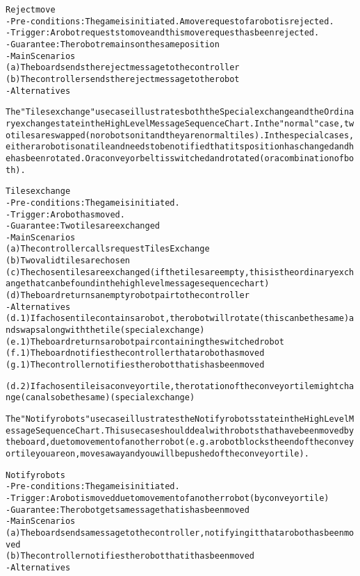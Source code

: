 \begin{alltt}
Reject move
- Pre-conditions: The game is initiated. A move request of a robot is rejected.
- Trigger: A robot requests to move and this move request has been rejected.
- Guarantee: The robot remains on the same position
- Main Scenarios
    (a) The board sends the reject message to the controller
    (b) The controller sends the reject message to the robot
- Alternatives

The "Tiles exchange" use case illustrates both the Special exchange and the Ordinary exchange state in the High Level Message Sequence Chart. In the "normal" case, two tiles are swapped (no robots on it and they are normal tiles). In the special cases, either a robot is on a tile and needs to be notified that its position has changed and he has been rotated. Or a conveyor belt is switched and rotated (or a combination of both).

Tiles exchange
- Pre-conditions: The game is initiated.
- Trigger:  A robot has moved.
- Guarantee: Two tiles are exchanged
- Main Scenarios
    (a) The controller calls requestTilesExchange
    (b) Two valid tiles are chosen
    (c) The chosen tiles are exchanged (if the tiles are empty, this is the ordinary exchange that can be found in the high level message sequence chart)
    (d) The board returns an empty robot pair to the controller
- Alternatives
    (d.1) If a chosen tile contains a robot, the robot will rotate (this can be the same) and swaps along with the tile (special exchange)
    (e.1) The board returns a robot pair containing the switched robot
    (f.1) The board notifies the controller that a robot has moved
    (g.1) The controller notifies the robot that is has been moved

    (d.2) If a chosen tile is a conveyor tile, the rotation of the conveyor tile might change (can also be the same) (special exchange)


The "Notify robots" use case illustrates the Notify robots state in the High Level Message Sequence Chart. This use case should deal with robots that have been moved by the board, due to movement of another robot (e.g. a robot blocks the end of the conveyor tile you are on, moves away and you will be pushed of the conveyor tile).

Notify robots
- Pre-conditions: The game is initiated.
- Trigger: A robot is moved due to movement of another robot (by conveyor tile)
- Guarantee: The robot gets a message that is has been moved
- Main Scenarios
    (a) The board sends a message to the controller, notifying it that a robot has been moved
    (b) The controller notifies the robot that it has been moved
- Alternatives


\end{alltt}
